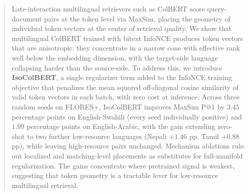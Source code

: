 \begin{abstract}
Late-interaction multilingual retrievers such as ColBERT score query-document pairs at the token level via MaxSim, placing the geometry of individual token vectors at the center of retrieval quality. We show that multilingual ColBERT trained with bitext InfoNCE produces token vectors that are anisotropic: they concentrate in a narrow cone with effective rank well below the embedding dimension, with the target-side language collapsing harder than the source-side. To address this, we introduce \textbf{IsoColBERT}, a single regularizer term added to the InfoNCE training objective that penalizes the mean squared off-diagonal cosine similarity of valid token vectors in each batch, with zero cost at inference. Across three random seeds on FLORES+, IsoColBERT improves MaxSim P@1 by $3.45$ percentage points on English-Swahili (every seed individually positive) and $1.99$ percentage points on English-Arabic, with the gain extending zero-shot to two further low-resource languages (Nepali $+1.46$ pp, Tamil $+0.88$ pp), while leaving high-resource pairs unchanged. Mechanism ablations rule out localized and matching-level placements as substitutes for full-manifold regularization. The gains concentrate where pretrained signal is weakest, suggesting that token geometry is a tractable lever for low-resource multilingual retrieval.
\end{abstract}
